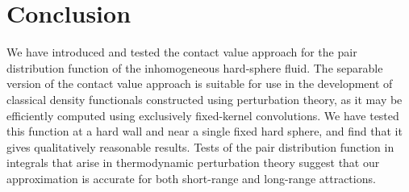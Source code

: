 \documentclass[letterpaper,twocolumn,amsmath,amssymb,pre,aps,10pt]{revtex4-1}
\begin{document}
\section{Conclusion}

We have introduced and tested the contact value approach for the pair
distribution function of the inhomogeneous hard-sphere fluid.  The
separable version of the contact value
approach is suitable for use in the development of classical
density functionals constructed using perturbation theory, as it
may be efficiently computed using exclusively fixed-kernel convolutions.  We have
tested this function at a hard wall and near a single fixed hard
sphere, and find that it gives qualitatively reasonable results.
Tests of the pair distribution function in integrals that arise in
thermodynamic perturbation theory suggest that our approximation is
accurate for both short-range and long-range attractions.

\end{document}
